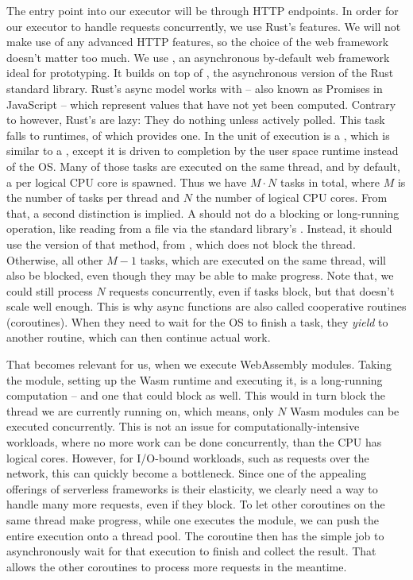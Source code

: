 The entry point into our executor will be through HTTP endpoints. In order for our executor to handle requests concurrently, we use Rust's  features. We will not make use of any advanced HTTP features, so the choice of the web framework doesn't matter too much. We use  \cite{Turon2021}, an asynchronous by-default web framework ideal for prototyping. It builds on top of , the asynchronous version of the Rust standard library.
Rust's async model works with  -- also known as Promises in JavaScript -- which represent values that have not yet been computed. Contrary to  however, Rust's  are lazy: They do nothing unless actively polled. This task falls to  runtimes, of which  provides one. In  the unit of execution is a , which is similar to a , except it is driven to completion by the user space runtime instead of the OS. Many of those tasks are executed on the same thread, and by default, a  per logical CPU core is spawned. Thus we have $M \cdot N$ tasks in total, where $M$ is the number of tasks per thread and $N$ the number of logical CPU cores.
From that, a second distinction is implied. A  should not do a blocking or long-running operation, like reading from a file via the standard library's . Instead, it should use the  version of that method, from , which does not block the thread. Otherwise, all other $M - 1$ tasks, which are executed on the same thread, will also be blocked, even though they may be able to make progress. Note that, we could still process $N$ requests concurrently, even if tasks block, but that doesn't scale well enough. This is why async functions are also called cooperative routines (coroutines). When they need to wait for the OS to finish a task, they \emph{yield} to another routine, which can then continue actual work.

That becomes relevant for us, when we execute WebAssembly modules. Taking the module, setting up the Wasm runtime and executing it, is a long-running computation -- and one that could block as well. This would in turn block the thread we are currently running on, which means, only $N$ Wasm modules can be executed concurrently. This is not an issue for computationally-intensive workloads, where no more work can be done concurrently, than the CPU has logical cores. However, for I/O-bound workloads, such as requests over the network, this can quickly become a bottleneck. Since one of the appealing offerings of serverless frameworks is their elasticity, we clearly need a way to handle many more requests, even if they block.
To let other coroutines on the same thread make progress, while one executes the module, we can push the entire execution onto a thread pool. The coroutine then has the simple job to asynchronously wait for that execution to finish and collect the result. That allows the other coroutines to process more requests in the meantime.

